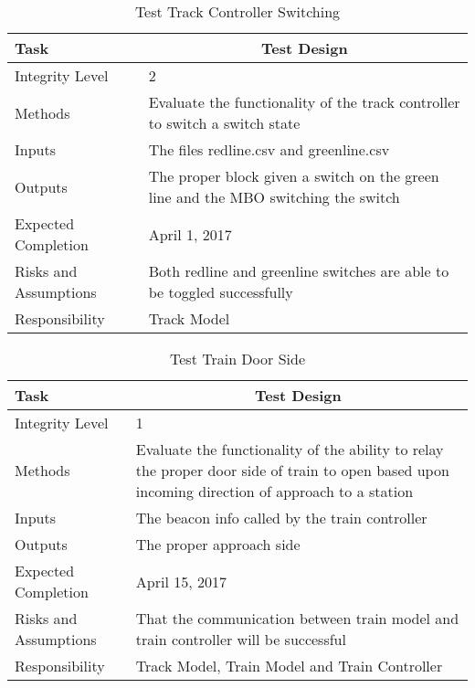 \documentclass[]{article}
\begin{document}
\begin{table}[H]
	\centering
	\caption{Test Track Controller Switching}
	\begin{tabular}{|l|l|}
		\hline
		Task & \multicolumn{1}{c|}{Test Design} \\ \hline
		Integrity Level & 2 \\ \hline
		Methods & Evaluate the functionality of the track controller to switch a switch state \\ \hline
		Inputs &  The files redline.csv and greenline.csv \\ \hline
		Outputs &  \parbox[t]{10cm}{The proper block given a switch on the green line and the MBO switching the switch}\\ \hline
		Expected Completion & April 1, 2017\\ \hline
		Risks and Assumptions & Both redline and greenline switches are able to be toggled successfully \\ \hline
		Responsibility & Track Model\\ \hline
	\end{tabular}
\end{table}

\begin{table}[H]
	\centering
	\caption{Test Train Door Side}
	\begin{tabular}{|l|l|}
		\hline
		Task & \multicolumn{1}{c|}{Test Design} \\ \hline
		Integrity Level & 1 \\ \hline
		Methods &  \parbox[t]{10cm}{Evaluate the functionality of the ability to relay the proper door side of train to open based upon incoming direction of approach to a station} \\ \hline
		Inputs &  The beacon info called by the train controller \\ \hline
		Outputs &  \parbox[t]{10cm}{The proper approach side}\\ \hline
		Expected Completion & April 15, 2017\\ \hline
		Risks and Assumptions & \parbox[t]{10cm}{That the communication between train model and train controller will be successful} \\ \hline
		Responsibility & Track Model, Train Model and Train Controller\\ \hline
	\end{tabular}
\end{table}
\end{document}
